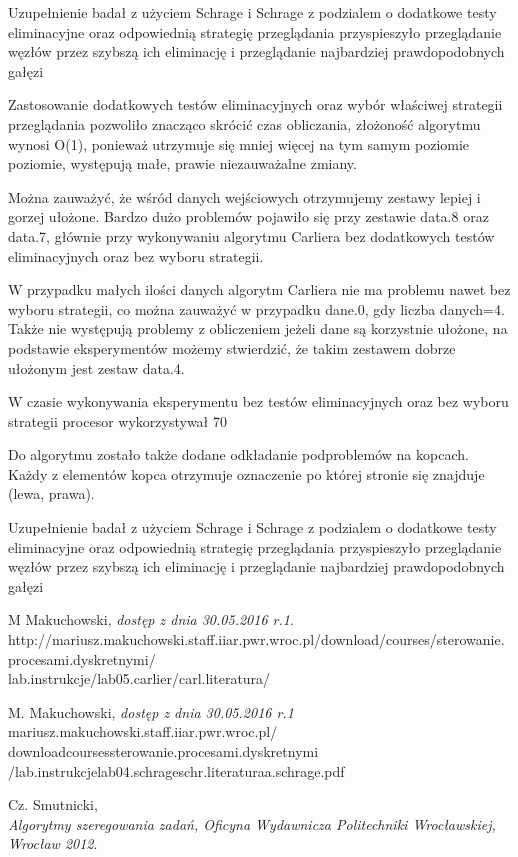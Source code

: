 \documentclass[11pt]{article}
\begin{document}
Uzupełnienie badał z użyciem Schrage i Schrage z podzialem o dodatkowe testy eliminacyjne
oraz odpowiednią strategię przeglądania przyspieszyło przeglądanie węzłów przez szybszą ich eliminację i przeglądanie najbardziej prawdopodobnych gałęzi

Zastosowanie dodatkowych testów eliminacyjnych oraz wybór właściwej strategii przeglądania pozwoliło znacząco skrócić czas obliczania, złożoność algorytmu wynosi O(1), ponieważ utrzymuje się mniej więcej na tym samym poziomie poziomie, występują małe, prawie niezauważalne zmiany.

Można zauważyć, że wśród danych wejściowych otrzymujemy zestawy lepiej i gorzej ułożone. Bardzo dużo problemów pojawiło się przy zestawie data.8 oraz data.7, głównie  przy wykonywaniu algorytmu Carliera bez dodatkowych testów eliminacyjnych oraz bez wyboru strategii.

W przypadku małych ilości danych algorytm Carliera nie ma problemu nawet bez wyboru strategii, co można zauważyć w przypadku dane.0, gdy liczba danych=4. Także nie występują problemy z obliczeniem jeżeli dane są korzystnie ułożone, na podstawie eksperymentów możemy stwierdzić, że takim zestawem dobrze ułożonym jest zestaw data.4.

W czasie wykonywania eksperymentu bez testów eliminacyjnych oraz bez wyboru strategii procesor wykorzystywał 70%

Do algorytmu zostało także dodane odkładanie podproblemów na kopcach. Każdy z elementów kopca otrzymuje oznaczenie po której stronie się znajduje (lewa, prawa).

Uzupełnienie badał z użyciem Schrage i Schrage z podzialem o dodatkowe testy eliminacyjne
oraz odpowiednią strategię przeglądania przyspieszyło przeglądanie węzłów przez szybszą ich eliminację i przeglądanie najbardziej prawdopodobnych gałęzi


\begin{thebibliography}{9}
M Makuchowski,
\textit{dostęp z dnia 30.05.2016 r.1}. \\
http://mariusz.makuchowski.staff.iiar.pwr.wroc.pl/download/courses/sterowanie.procesami.dyskretnymi/\\lab.instrukcje/lab05.carlier/carl.literatura/%

M. Makuchowski,
\textit{dostęp z dnia 30.05.2016 r.1}
mariusz.makuchowski.staff.iiar.pwr.wroc.pl/
downloadcoursessterowanie.procesami.dyskretnymi
/lab.instrukcjelab04.schrageschr.literaturaa.schrage.pdf
 
Cz. Smutnicki,\\
\textit{Algorytmy szeregowania zadań, Oficyna Wydawnicza Politechniki Wrocławskiej, Wrocław 2012}. 
 
\end{thebibliography}
\end{document}
